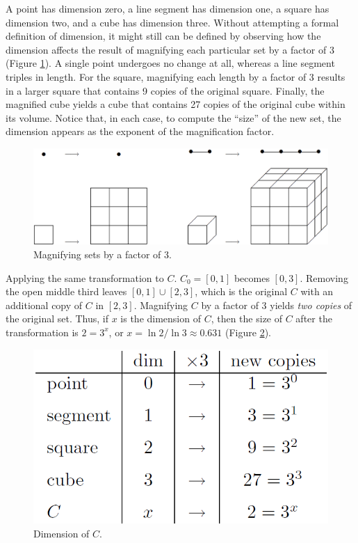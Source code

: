 \documentclass{article}
\begin{document}
            A point has dimension zero, a line segment has dimension one, a square has dimension two, and a cube has dimension three. Without attempting a formal definition of dimension, it might still can be defined by observing how the dimension affects the result of magnifying each particular set by a factor of 3 (Figure \ref{cantordim}). A single point undergoes no change at all, whereas a line segment triples in length. For the square, magnifying each length by a factor of 3 results in a larger square that contains 9 copies of the original square. Finally, the magnified cube yields a cube that contains 27 copies of the original cube within its volume. Notice that, in each case, to compute the “size” of the new set, the dimension appears as the exponent of the magnification factor.
            \begin{figure}[ht!]
                \centering
                \includegraphics[width=0.8\linewidth]{figs/cantordim.png}
                \caption{Magnifying sets by a factor of 3.}
                \label{cantordim}
            \end{figure}
            
            Applying the same transformation to $C$. $C_0=[0,1]$ becomes $[0,3]$. Removing the open middle third leaves $[0,1]\cup[2,3]$, which is the original $C$ with an additional copy of $C$ in $[2,3]$. Magnifying $C$ by a factor of 3 yields \textit{two copies} of the original set. Thus, if $x$ is the dimension of $C$, then the size of $C$ after the transformation is $2=3^x$, or $x = \ln{2}/\ln{3} \approx 0.631$ (Figure \ref{cantorsize}).
            \begin{figure}[ht!]
                \centering
                \includegraphics[width=0.45\linewidth]{figs/cantorsize.png}
                \caption{Dimension of $C$.}
                \label{cantorsize}
            \end{figure}
            
\end{document}
